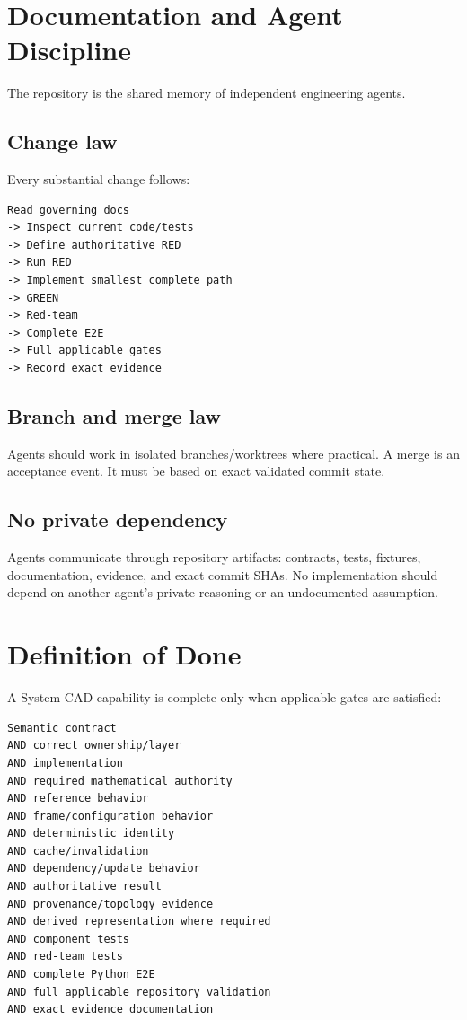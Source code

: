 \documentclass[11pt,a4paper]{report}
\begin{document}
\chapter{Documentation and Agent Discipline}

The repository is the shared memory of independent engineering agents.

\section{Change law}

Every substantial change follows:

\begin{lstlisting}
Read governing docs
-> Inspect current code/tests
-> Define authoritative RED
-> Run RED
-> Implement smallest complete path
-> GREEN
-> Red-team
-> Complete E2E
-> Full applicable gates
-> Record exact evidence
\end{lstlisting}

\section{Branch and merge law}
Agents should work in isolated branches/worktrees where practical. A merge is an acceptance event. It must be based on exact validated commit state.

\section{No private dependency}
Agents communicate through repository artifacts: contracts, tests, fixtures, documentation, evidence, and exact commit SHAs. No implementation should depend on another agent's private reasoning or an undocumented assumption.

\chapter{Definition of Done}

A System-CAD capability is complete only when applicable gates are satisfied:

\begin{lstlisting}
Semantic contract
AND correct ownership/layer
AND implementation
AND required mathematical authority
AND reference behavior
AND frame/configuration behavior
AND deterministic identity
AND cache/invalidation
AND dependency/update behavior
AND authoritative result
AND provenance/topology evidence
AND derived representation where required
AND component tests
AND red-team tests
AND complete Python E2E
AND full applicable repository validation
AND exact evidence documentation
\end{lstlisting}
\end{document}
